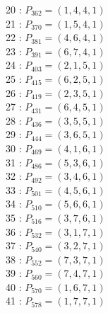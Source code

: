 \documentclass{article}
\begin{document}
{\begin{multicols}{2}
20 : $P_{362}=( 1, 4, 4, 1 )$\\
21 : $P_{370}=( 1, 5, 4, 1 )$\\
22 : $P_{381}=( 4, 6, 4, 1 )$\\
23 : $P_{391}=( 6, 7, 4, 1 )$\\
24 : $P_{403}=( 2, 1, 5, 1 )$\\
25 : $P_{415}=( 6, 2, 5, 1 )$\\
26 : $P_{419}=( 2, 3, 5, 1 )$\\
27 : $P_{431}=( 6, 4, 5, 1 )$\\
28 : $P_{436}=( 3, 5, 5, 1 )$\\
29 : $P_{444}=( 3, 6, 5, 1 )$\\
30 : $P_{469}=( 4, 1, 6, 1 )$\\
31 : $P_{486}=( 5, 3, 6, 1 )$\\
32 : $P_{492}=( 3, 4, 6, 1 )$\\
33 : $P_{501}=( 4, 5, 6, 1 )$\\
34 : $P_{510}=( 5, 6, 6, 1 )$\\
35 : $P_{516}=( 3, 7, 6, 1 )$\\
36 : $P_{532}=( 3, 1, 7, 1 )$\\
37 : $P_{540}=( 3, 2, 7, 1 )$\\
38 : $P_{552}=( 7, 3, 7, 1 )$\\
39 : $P_{560}=( 7, 4, 7, 1 )$\\
40 : $P_{570}=( 1, 6, 7, 1 )$\\
41 : $P_{578}=( 1, 7, 7, 1 )$\\
\end{multicols}
}
\end{document}
